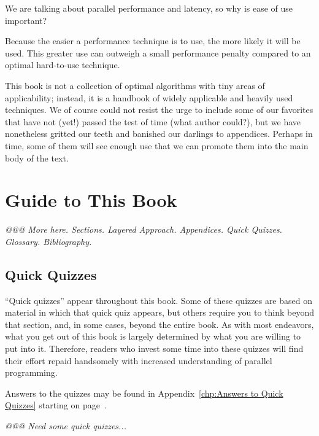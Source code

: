 We are talking about parallel performance and latency,
so why is ease of use important?

Because the easier a performance technique is to use, the more likely
it will be used.
This greater use can outweigh a small performance penalty compared
to an optimal hard-to-use technique.

This book is not a collection of optimal algorithms with tiny areas of
applicability; instead, it is a handbook of widely applicable and heavily
used techniques.
We of course could not resist the urge to include some of our favorites
that have not (yet!) passed the test of time (what author could?), but
we have nonetheless gritted our teeth and banished our darlings to
appendices.
Perhaps in time, some of them will see enough use that we can promote
them into the main body of the text.

\section{Guide to This Book}
\label{sec:intro:Guide to This Book}

\emph{@@@ More here.  Sections.  Layered Approach.  Appendices.
Quick Quizzes.  Glossary.  Bibliography.}

\subsection{Quick Quizzes}

``Quick quizzes'' appear throughout this book.
Some of these quizzes are based on material in which that quick quiz
appears, but others require you to think beyond that section, and,
in some cases, beyond the entire book.
As with most endeavors, what you get out of this book is largely
determined by what you are willing to put into it.
Therefore, readers who invest some time into these quizzes will
find their effort repaid handsomely with increased understanding
of parallel programming.

Answers to the quizzes may be found in
Appendix~\ref{chp:Answers to Quick Quizzes} starting on
page~\pageref{chp:Answers to Quick Quizzes}.

\emph{@@@ Need some quick quizzes...}

